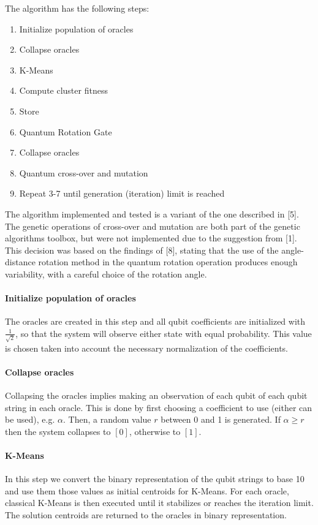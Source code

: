The algorithm has the following steps:
\begin{enumerate}
\item Initialize population of oracles
\item Collapse oracles
\item K-Means
\item Compute cluster fitness
\item Store
\item Quantum Rotation Gate
\item Collapse oracles
\item Quantum cross-over and mutation
\item Repeat 3-7 until generation (iteration) limit is reached
\end{enumerate}



The algorithm implemented and tested is a variant of the one described in [5]. The genetic operations of cross-over and mutation are both part of the genetic algorithms toolbox, but were not implemented due to the suggestion from [1]. This decision was based on the findings of [8], stating that the use of the angle-distance rotation method in the quantum rotation operation produces enough variability, with a careful choice of the rotation angle.

\paragraph{Initialize population of oracles}

The oracles are created in this step and all qubit coefficients are initialized with $\frac{1}{\sqrt{2}}$, so that the system will observe either state with equal probability. This value is chosen taken into account the necessary normalization of the coefficients.

\paragraph{Collapse oracles}

Collapsing the oracles implies making an observation of each qubit of each qubit string in each oracle. This is done by first choosing a coefficient to use (either can be used), e.g. $\alpha$. Then, a random value $r$ between 0 and 1 is generated. If $\alpha \ge r$ then the system collapses to $[0]$, otherwise to $[1]$.

\paragraph{K-Means}
In this step we convert the binary representation of the qubit strings to base 10 and use them those values as initial centroids for K-Means. For each oracle, classical K-Means is then executed until it stabilizes or reaches the iteration limit. The solution centroids are returned to the oracles in binary representation.

